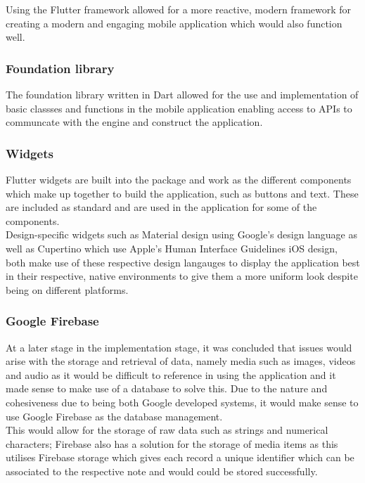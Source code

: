\documentclass{report}
\begin{document}
Using the Flutter framework allowed for a more reactive, modern framework for creating a modern and engaging mobile application which would also function well.

		\subsubsection{Foundation library}
The foundation library written in Dart allowed for the use and implementation of basic classses and functions in the mobile application enabling access to APIs to communcate with the engine and construct the application.

		\subsubsection{Widgets}
Flutter widgets are built into the package and work as the different components which make up together to build the application, such as buttons and text. These are included as standard and are used in the application for some of the components.\\

Design-specific widgets such as Material design using Google's design language as well as Cupertino which use Apple's Human Interface Guidelines iOS design, both make use of these respective design langauges to display the application best in their respective, native environments to give them a more uniform look despite being on different platforms.
	
		\subsubsection{Google Firebase}
At a later stage in the implementation stage, it was concluded that issues would arise with the storage and retrieval of data, namely media such as images, videos and audio as it would be difficult to reference in using the application and it made sense to make use of a database to solve this. Due to the nature and cohesiveness due to being both Google developed systems, it would make sense to use Google Firebase as the database management.\\

This would allow for the storage of raw data such as strings and numerical characters; Firebase also has a solution for the storage of media items as this utilises Firebase storage which gives each record a unique identifier which can be associated to the respective note and would could be stored successfully.
\end{document}
